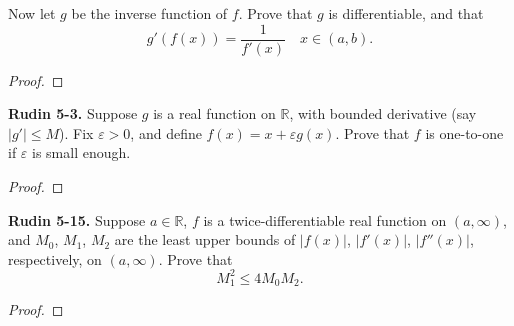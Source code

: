 \documentclass{article}
\newcommand{\R}{\mathbb{R}}
\newcommand{\abs}[1]{\left| #1 \right|}
\newcommand{\problem}[1]{\noindent \textbf{#1}}
\begin{document}
Now let $g$ be the inverse function of $f$. Prove that $g$ is differentiable, and that
$$g'(f(x)) = \frac{1}{f'(x)} \quad x \in (a, b).$$
\begin{proof}
    
\end{proof}


\problem{Rudin 5-3. }
Suppose $g$ is a real function on $\R$, with bounded derivative (say $\abs{g'} \le M$). Fix $\varepsilon > 0$, and define $f(x) = x + \varepsilon g(x)$. Prove that $f$ is one-to-one if $\varepsilon$ is small enough.

\begin{proof}
    
\end{proof}


\problem{Rudin 5-15. }
Suppose $a \in \R$, $f$ is a twice-differentiable real function on $(a, \infty)$, and $M_0$, $M_1$, $M_2$ are the least upper bounds of $\abs{f(x)}$, $\abs{f'(x)}$, $\abs{f''(x)}$, respectively, on $(a, \infty)$. Prove that
$$M_1^2 \le 4 M_0 M_2.$$

\begin{proof}
    
\end{proof}
\end{document}
